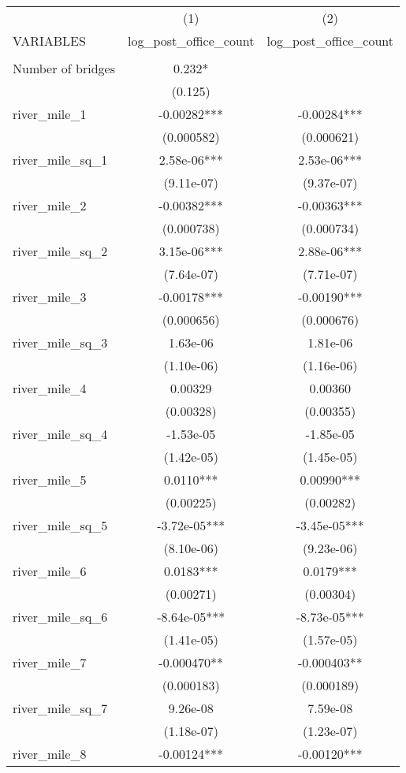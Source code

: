 \begin{tabular}{lcc} \hline
 & (1) & (2) \\
VARIABLES & log\_post\_office\_count & log\_post\_office\_count \\ \hline
 &  &  \\
Number of bridges & 0.232* &  \\
 & (0.125) &  \\
river\_mile\_1 & -0.00282*** & -0.00284*** \\
 & (0.000582) & (0.000621) \\
river\_mile\_sq\_1 & 2.58e-06*** & 2.53e-06*** \\
 & (9.11e-07) & (9.37e-07) \\
river\_mile\_2 & -0.00382*** & -0.00363*** \\
 & (0.000738) & (0.000734) \\
river\_mile\_sq\_2 & 3.15e-06*** & 2.88e-06*** \\
 & (7.64e-07) & (7.71e-07) \\
river\_mile\_3 & -0.00178*** & -0.00190*** \\
 & (0.000656) & (0.000676) \\
river\_mile\_sq\_3 & 1.63e-06 & 1.81e-06 \\
 & (1.10e-06) & (1.16e-06) \\
river\_mile\_4 & 0.00329 & 0.00360 \\
 & (0.00328) & (0.00355) \\
river\_mile\_sq\_4 & -1.53e-05 & -1.85e-05 \\
 & (1.42e-05) & (1.45e-05) \\
river\_mile\_5 & 0.0110*** & 0.00990*** \\
 & (0.00225) & (0.00282) \\
river\_mile\_sq\_5 & -3.72e-05*** & -3.45e-05*** \\
 & (8.10e-06) & (9.23e-06) \\
river\_mile\_6 & 0.0183*** & 0.0179*** \\
 & (0.00271) & (0.00304) \\
river\_mile\_sq\_6 & -8.64e-05*** & -8.73e-05*** \\
 & (1.41e-05) & (1.57e-05) \\
river\_mile\_7 & -0.000470** & -0.000403** \\
 & (0.000183) & (0.000189) \\
river\_mile\_sq\_7 & 9.26e-08 & 7.59e-08 \\
 & (1.18e-07) & (1.23e-07) \\
river\_mile\_8 & -0.00124*** & -0.00120*** \\

\end{tabular}
